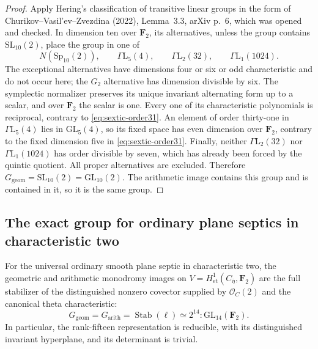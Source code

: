 \begin{proof}
Apply Hering's classification of transitive linear groups in the
form of Churikov--Vasil'ev--Zvezdina (2022), Lemma~3.3, arXiv p.~6,
which was opened and checked.  In dimension ten over $\mathbf F_2$,
its alternatives, unless the group contains $\mathrm{SL}_{10}(2)$,
place the group in one of
\[
 N(\mathrm{Sp}_{10}(2)),\qquad
 \Gamma\mathrm L_5(4),\qquad
 \Gamma\mathrm L_2(32),\qquad
 \Gamma\mathrm L_1(1024).
\]
The exceptional alternatives have dimensions four or six or odd
characteristic and do not occur here; the $G_2$ alternative has
dimension divisible by six.
The symplectic normalizer preserves its unique invariant alternating
form up to a scalar, and over $\mathbf F_2$ the scalar is one.
Every one of its characteristic polynomials is reciprocal, contrary
to \eqref{eq:sextic-order31}.
An element of order thirty-one in $\Gamma\mathrm L_5(4)$ lies in
$\mathrm{GL}_5(4)$, so its fixed space has even dimension over
$\mathbf F_2$, contrary to the fixed dimension five in
\eqref{eq:sextic-order31}.
Finally, neither $\Gamma\mathrm L_2(32)$ nor
$\Gamma\mathrm L_1(1024)$ has order divisible by seven, which has
already been forced by the quintic quotient.
All proper alternatives are excluded.  Therefore
$G_{\mathrm{geom}}=\mathrm{SL}_{10}(2)=\mathrm{GL}_{10}(2)$.
The arithmetic image contains this group and is contained in it,
so it is the same group.
\end{proof}

\subsection{The exact group for ordinary plane septics in characteristic two}
\label{subsec:septic-exact}

\begin{theorem}\label{thm:septic-stabilizer-monodromy}
For the universal ordinary smooth plane septic in characteristic two,
the geometric and arithmetic monodromy images on
$V=H^1_{\mathrm{et}}(C_{\bar\eta},\mathbf F_2)$ are the full stabilizer
of the distinguished nonzero covector supplied by
$\mathcal O_C(2)$ and the canonical theta characteristic:
\[
 G_{\mathrm{geom}}=G_{\mathrm{arith}}
 =\operatorname{Stab}(\ell)
 \simeq 2^{14}\!:\mathrm{GL}_{14}(\mathbf F_2).
\]
In particular, the rank-fifteen representation is reducible, with its
distinguished invariant hyperplane, and its determinant is trivial.
\end{theorem}


